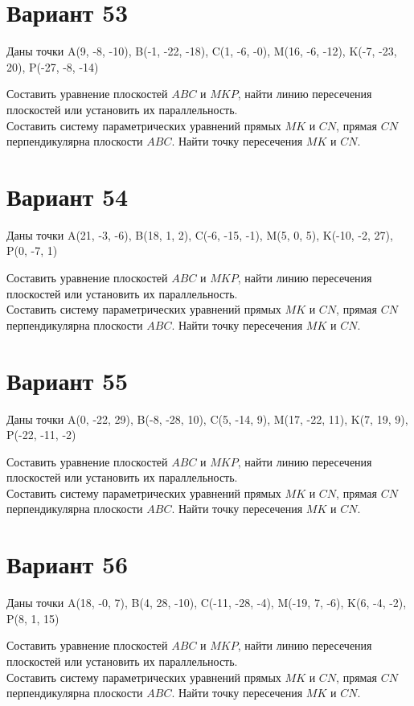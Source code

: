 \documentclass[11pt]{article}
\begin{document}
\section*{Вариант 53}
Даны точки A(9, -8, -10), B(-1, -22, -18), C(1, -6, -0), M(16, -6, -12), K(-7, -23, 20), P(-27, -8, -14)

Составить уравнение плоскостей $ABC$ и $MKP$, найти линию пересечения плоскостей или установить их параллельность.\\
Составить систему параметрических уравнений прямых $MK$ и $CN$, прямая $CN$ перпендикулярна плоскости $ABC$. Найти точку пересечения $MK$ и $CN$.

\section*{Вариант 54}
Даны точки A(21, -3, -6), B(18, 1, 2), C(-6, -15, -1), M(5, 0, 5), K(-10, -2, 27), P(0, -7, 1)

Составить уравнение плоскостей $ABC$ и $MKP$, найти линию пересечения плоскостей или установить их параллельность.\\
Составить систему параметрических уравнений прямых $MK$ и $CN$, прямая $CN$ перпендикулярна плоскости $ABC$. Найти точку пересечения $MK$ и $CN$.

\section*{Вариант 55}
Даны точки A(0, -22, 29), B(-8, -28, 10), C(5, -14, 9), M(17, -22, 11), K(7, 19, 9), P(-22, -11, -2)

Составить уравнение плоскостей $ABC$ и $MKP$, найти линию пересечения плоскостей или установить их параллельность.\\
Составить систему параметрических уравнений прямых $MK$ и $CN$, прямая $CN$ перпендикулярна плоскости $ABC$. Найти точку пересечения $MK$ и $CN$.

\section*{Вариант 56}
Даны точки A(18, -0, 7), B(4, 28, -10), C(-11, -28, -4), M(-19, 7, -6), K(6, -4, -2), P(8, 1, 15)

Составить уравнение плоскостей $ABC$ и $MKP$, найти линию пересечения плоскостей или установить их параллельность.\\
Составить систему параметрических уравнений прямых $MK$ и $CN$, прямая $CN$ перпендикулярна плоскости $ABC$. Найти точку пересечения $MK$ и $CN$.
\end{document}

